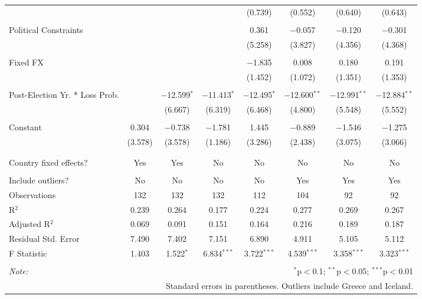 \begin{tabular}{@{\extracolsep{5pt}}lccccccc}
  &  &  &  & (0.739) & (0.552) & (0.640) & (0.643) \\ 
  & & & & & & & \\ 
 Political Constraints &  &  &  & 0.361 & $-$0.057 & $-$0.120 & $-$0.301 \\ 
  &  &  &  & (5.258) & (3.827) & (4.356) & (4.368) \\ 
  & & & & & & & \\ 
 Fixed FX &  &  &  & $-$1.835 & 0.008 & 0.180 & 0.191 \\ 
  &  &  &  & (1.452) & (1.072) & (1.351) & (1.353) \\ 
  & & & & & & & \\ 
 Post-Election Yr. * Loss Prob. &  & $-$12.599$^{*}$ & $-$11.413$^{*}$ & $-$12.495$^{*}$ & $-$12.600$^{**}$ & $-$12.991$^{**}$ & $-$12.884$^{**}$ \\ 
  &  & (6.667) & (6.319) & (6.468) & (4.800) & (5.548) & (5.552) \\ 
  & & & & & & & \\ 
 Constant & 0.304 & $-$0.738 & $-$1.781 & 1.445 & $-$0.889 & $-$1.546 & $-$1.275 \\ 
  & (3.578) & (3.578) & (1.186) & (3.286) & (2.438) & (3.075) & (3.066) \\ 
  & & & & & & & \\ 
\hline \\[-1.8ex] 
Country fixed effects? & Yes & Yes & No & No & No & No & No \\ 
\hline \\[-1.8ex] 
Include outliers? & No & No & No & No & Yes & Yes & Yes \\ 
Observations & 132 & 132 & 132 & 112 & 104 & 92 & 92 \\ 
R$^{2}$ & 0.239 & 0.264 & 0.177 & 0.224 & 0.277 & 0.269 & 0.267 \\ 
Adjusted R$^{2}$ & 0.069 & 0.091 & 0.151 & 0.164 & 0.216 & 0.189 & 0.187 \\ 
Residual Std. Error & 7.490 & 7.402 & 7.151 & 6.890 & 4.911 & 5.105 & 5.112 \\ 
F Statistic & 1.403 & 1.522$^{*}$ & 6.834$^{***}$ & 3.722$^{***}$ & 4.539$^{***}$ & 3.358$^{***}$ & 3.323$^{***}$ \\ 
\hline 
\hline \\[-1.8ex] 
\textit{Note:}  & \multicolumn{7}{r}{$^{*}$p$<$0.1; $^{**}$p$<$0.05; $^{***}$p$<$0.01} \\ 
 & \multicolumn{7}{r}{Standard errors in parentheses. Outliers include Greece and Iceland.} \\ 
\end{tabular} 
\endgroup 
